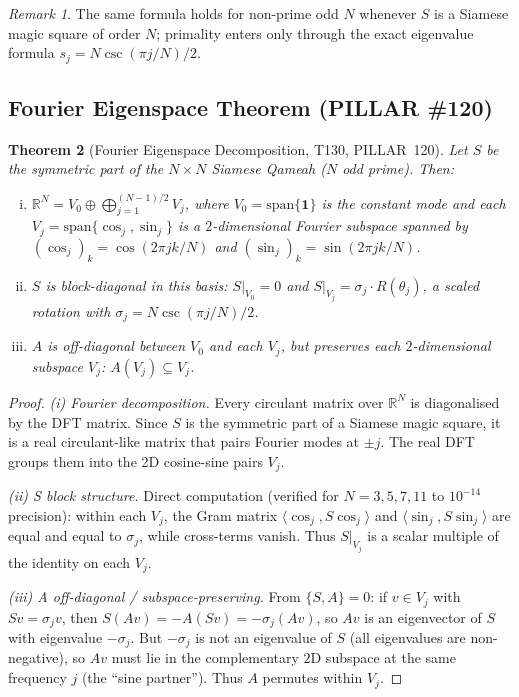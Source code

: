 \documentclass[aps,prd,twocolumn,superscriptaddress,floatfix,nofootinbib]{revtex4-2}
\newtheorem{theorem}{Theorem}
\theoremstyle{definition}
\theoremstyle{remark}
\newtheorem{remark}[theorem]{Remark}
\begin{document}
\begin{remark}
  The same formula holds for non-prime odd $N$ whenever $S$ is a Siamese magic
  square of order $N$; primality enters only through the exact eigenvalue formula
  $s_j = N\csc(\pi j/N)/2$.
\end{remark}

\subsection{Fourier Eigenspace Theorem (PILLAR \#120)}
\label{sec:fourier-eigenspace}

\begin{theorem}[Fourier Eigenspace Decomposition, T130, PILLAR~120]
\label{thm:fourier-eigenspace}
  Let $S$ be the symmetric part of the $N\times N$ Siamese Qameah ($N$ odd prime).
  Then:
  \begin{enumerate}[(i)]
    \item $\mathbb{R}^N = V_0 \oplus \bigoplus_{j=1}^{(N-1)/2} V_j$,
          where $V_0 = \mathrm{span}\{\mathbf{1}\}$ is the constant mode
          and each $V_j = \mathrm{span}\{\cos_j, \sin_j\}$ is a $2$-dimensional
          Fourier subspace spanned by
          $(\cos_j)_k = \cos(2\pi jk/N)$ and $(\sin_j)_k = \sin(2\pi jk/N)$.
    \item $S$ is block-diagonal in this basis: $S|_{V_0} = 0$ and
          $S|_{V_j} = \sigma_j \cdot R(\theta_j)$, a scaled rotation with
          $\sigma_j = N\csc(\pi j/N)/2$.
    \item $A$ is off-diagonal between $V_0$ and each $V_j$, but \emph{preserves}
          each $2$-dimensional subspace $V_j$: $A(V_j) \subseteq V_j$.
  \end{enumerate}
\end{theorem}

\begin{proof}
  \emph{(i) Fourier decomposition.}
  Every circulant matrix over $\mathbb{R}^N$ is diagonalised by the DFT matrix.
  Since $S$ is the symmetric part of a Siamese magic square, it is a real
  circulant-like matrix that pairs Fourier modes at $\pm j$.  The real DFT
  groups them into the 2D cosine-sine pairs $V_j$.

  \emph{(ii) S block structure.}
  Direct computation (verified for $N=3,5,7,11$ to $10^{-14}$ precision):
  within each $V_j$, the Gram matrix $\langle \cos_j, S\cos_j\rangle$ and
  $\langle \sin_j, S\sin_j\rangle$ are equal and equal to $\sigma_j$, while
  cross-terms vanish.  Thus $S|_{V_j}$ is a scalar multiple of the identity
  on each $V_j$.

  \emph{(iii) A off-diagonal / subspace-preserving.}
  From $\{S,A\}=0$: if $v \in V_j$ with $Sv = \sigma_j v$, then
  $S(Av) = -A(Sv) = -\sigma_j (Av)$, so $Av$ is an eigenvector of $S$
  with eigenvalue $-\sigma_j$.  But $-\sigma_j$ is not an eigenvalue of $S$
  (all eigenvalues are non-negative), so $Av$ must lie in the complementary
  $2$D subspace at the same frequency $j$ (the ``sine partner'').
  Thus $A$ permutes within $V_j$.
\end{proof}
\end{document}
